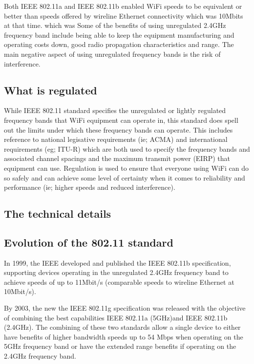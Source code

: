 Both IEEE 802.11a and IEEE 802.11b enabled WiFi speeds to be equivalent or better than speeds offered by wireline Ethernet connectivity which was  10Mbits at that time. which was Some of the benefits of using unregulated 2.4GHz frequency band include being able to keep the equipment manufacturing and operating costs down, good radio propagation characteristics and range.  The main negative aspect of using unregulated frequency bands is the risk of interference. 

\subsection{What is regulated}

While IEEE 802.11 standard specifies the unregulated or lightly regulated frequency bands that WiFi equipment can operate in, this standard does spell out the limits under which these frequency bands can operate.  This includes reference to national legisative requirements (ie; ACMA) and international requirements (eg; ITU-R) which are both used to specify the frequency bands and associated channel spacings and the maximum transmit power (EIRP) that equipment can use. Regulation is used to ensure that everyone using WiFi can do so safely and can achieve some level of certainty when it comes to reliability and performance (ie; higher speeds and reduced interference).

\subsection{The technical details}

\subsection{Evolution of the 802.11 standard}

In 1999, the IEEE developed and published the IEEE 802.11b specification, supporting devices operating in the unregulated 2.4GHz frequency band to achieve speeds of up to 11Mbit/s (comparable speeds to wireline Ethernet at 10Mbit/s).

By 2003, the new the IEEE 802.11g specification was released with the objective of combining the best capabilities IEEE 802.11a (5GHz)and IEEE 802.11b (2.4GHz). The combining of these two standards allow a single device to either have benefits of higher bandwidth speeds up to 54 Mbps when operating on the 5GHz frequency band or have the extended range benefits if operating on the 2.4GHz frequency band. 

